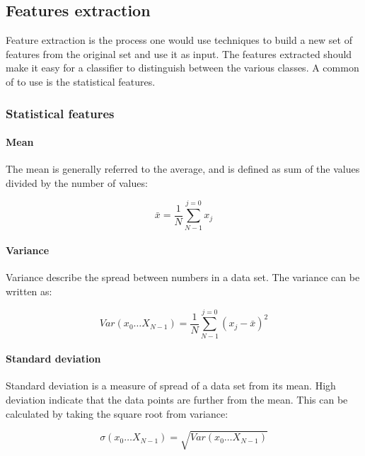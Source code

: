 \documentclass[USenglish]{ifimaster}  %
\begin{document}
\subsection{Features extraction} \label{feature_extraction}
Feature extraction is the process one would use techniques to build a new set of features from the original set and use it as input. The features extracted should make it easy for a classifier to distinguish between the various classes. A common of to use is the statistical features.

\subsubsection{Statistical features}

\paragraph{Mean}
The mean is generally referred to the average, and is defined as sum of the values divided by the number of values\cite{Press:2007:NRE:1403886}:

\begin{equation}
\bar{x} = \frac{1}{N}\sum_{N-1}^{j=0}x_{j}
\label{eq:mean}
\end{equation}


\paragraph{Variance}
Variance describe the spread between numbers in a data set. The variance can be written as\cite{Press:2007:NRE:1403886}:

\begin{equation}
Var(x_0\dotsc X_{N-1})  = \frac{1}{N}\sum_{N-1}^{j=0}(x_{j}-\bar{x})^2
\label{eq:variance}
\end{equation}

\paragraph{Standard deviation}
Standard deviation is a measure of spread of a data set from its mean. High deviation indicate that the data points are further from the mean. This can be calculated by taking the square root from variance\cite{Press:2007:NRE:1403886}:

\begin{equation}
\sigma(x_0\dotsc X_{N-1})  = \sqrt{Var(x_0\dotsc X_{N-1})}
\label{eq:std}
\end{equation}
\end{document}
